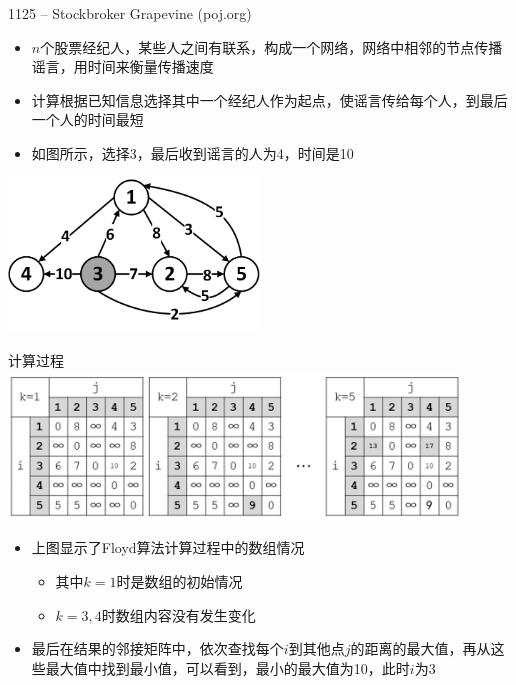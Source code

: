 \begin{frame}{1125 -- Stockbroker Grapevine (poj.org)}
    \begin{itemize}
        \item $n$个股票经纪人，某些人之间有联系，构成一个网络，网络中相邻的节点传播谣言，用时间来衡量传播速度
        \item 计算根据已知信息选择其中一个经纪人作为起点，使谣言传给每个人，到最后一个人的时间最短
        \item 如图所示，选择3，最后收到谣言的人为4，时间是10
    \end{itemize}
    \includegraphics[width=0.5\textwidth,center]{fig/8-2.png}
\end{frame}
\begin{frame}{计算过程}
    \includegraphics[width=0.9\textwidth,center]{fig/8-3.png}
    \begin{itemize}
        \item 上图显示了Floyd算法计算过程中的数组情况
        \begin{itemize}
            \item 其中$k=1$时是数组的初始情况
            \item $k=3,4$时数组内容没有发生变化
        \end{itemize}
        \item 最后在结果的邻接矩阵中，依次查找每个$i$到其他点$j$的距离的最大值，再从这些最大值中找到最小值，可以看到，最小的最大值为10，此时$i$为3
    \end{itemize}
\end{frame}
